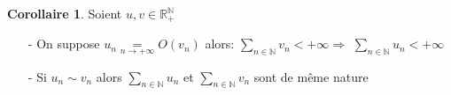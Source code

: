 \documentclass[fleqn]{article}
\theoremstyle{definition} \newtheorem*{defi}{D\'efinition}
\theoremstyle{definition} \newtheorem*{theo}{Th\'eor\`eme}
\theoremstyle{definition} \newtheorem*{coro}{Corollaire}
\theoremstyle{remark} \newtheorem*{rqs}{Remarques}
\theoremstyle{definition} \newtheorem*{prop}{Propri\'et\'e}
\begin{document}
\begin{coro} Soient $u,v \in \mathbb{R}_+^\mathbb{N}$
\begin{enumerate}
	\item [-] On suppose $u_n \underset{n \rightarrow +\infty}{=} O(v_n)$ alors:  $\sum_{n \in \mathbb{N}} v_n < +\infty \Rightarrow$
	$\sum_{n \in \mathbb{N}} u_n < +\infty$
	\item [-] Si $u_n \sim v_n$ alors $\sum_{n \in \mathbb{N}} u_n$ et $\sum_{n \in \mathbb{N}} v_n$ sont de m\^eme nature
\end{enumerate}
\end{coro}
\end{document}
